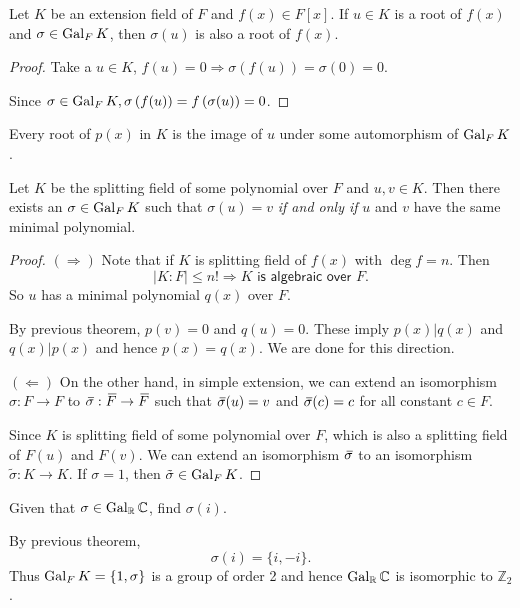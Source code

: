 \begin{theorem}
    Let $K$ be an extension field of $F$ and $f(x) \in F[x]$. If $u \in K$ is a root of $f(x)$ and $\sigma \in \operatorname{Gal}_F K$, 
    then $\sigma(u)$ is also a root of $f(x)$.
\end{theorem}
\begin{proof}
    Take a $u \in K$, $f(u) = 0 \Longrightarrow \sigma(f(u)) = \sigma(0) = 0$. 

    Since $\sigma \in \operatorname{Gal}_F K, \sigma \left( f(u) \right) = f\left( \sigma(u) \right) = 0$.
\end{proof}

\begin{remark}
    Every root of $p(x)$ in $K$ is the image of $u$ under some automorphism of $\operatorname{Gal}_F K$.
\end{remark}

\begin{theorem}
    Let $K$ be the splitting field of some polynomial over $F$ and $u,v \in K$. Then there exists an $\sigma \in \operatorname{Gal}_F K$ 
    such that $\sigma(u) = v$ \textit{if and only if} $u$ and $v$ have the same minimal polynomial. 
\end{theorem}
\begin{proof}
    $(\Rightarrow)$ Note that if $K$ is splitting field of $f(x)$ with $\deg f = n$. Then 
    \[
        |K:F| \leq n! \Longrightarrow K \textsf{ is algebraic over } F.
    \]
    So $u$ has a minimal polynomial $q(x)$ over $F$.

    By previous theorem, $p(v) = 0$ and $q(u) = 0$. These imply $p(x) | q(x)$ and 
    $q(x) | p(x)$ and hence $p(x) = q(x)$. We are done for this direction.

    $(\Leftarrow)$ On the other hand, in simple extension, we can extend an isomorphism 
    $\sigma: F \to F$ to $\,\overline{\!{\sigma}}: \,\overline{\!{F}} \to \,\overline{\!{F}}$ such that 
    $\,\overline{\!{\sigma}}(u) = v$ and $\,\overline{\!{\sigma}}(c) = c$ for all constant $c \in F$. 

    Since $K$ is splitting field of some polynomial over $F$, which is also a splitting field of 
    $F(u)$ and $F(v)$. We can extend an isomorphism $\,\overline{\!{\sigma}}$ to an isomorphism 
    $\tilde{\sigma}: K \to K$. If $\sigma = 1$, then $\tilde{\sigma} \in \operatorname{Gal}_F K$.
\end{proof}

\begin{example}
    Given that $\sigma \in \operatorname{Gal}_\mathbb{R} \mathbb{C}$, find $\sigma(i)$.
\end{example}
\begin{solution}
    By previous theorem,
    \[
        \sigma(i) = \{ i, - i \}.
    \]
    Thus $\operatorname{Gal}_F K = \{1, \sigma \}$ is a group of order 2 and hence $\operatorname{Gal}_\mathbb{R} \mathbb{C}$ 
    is isomorphic to $\mathbb{Z}_2$.
\end{solution}

